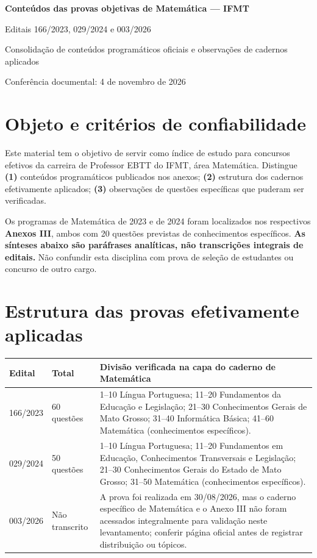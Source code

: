 \documentclass[11pt,a4paper]{article}
\begin{document}
\begin{center}
{\LARGE\bfseries Conteúdos das provas objetivas de Matemática --- IFMT\par}
\vspace{5pt}
{\large Editais 166/2023, 029/2024 e 003/2026\par}
\vspace{5pt}
{\small Consolidação de conteúdos programáticos oficiais e observações de cadernos aplicados\par}
{\small Conferência documental: 4 de novembro de 2026}
\end{center}
\tableofcontents\newpage
\section{Objeto e critérios de confiabilidade}
Este material tem o objetivo de servir como índice de estudo para concursos efetivos da carreira de Professor EBTT do IFMT, área Matemática. Distingue \textbf{(1)} conteúdos programáticos publicados nos anexos; \textbf{(2)} estrutura dos cadernos efetivamente aplicados; \textbf{(3)} observações de questões específicas que puderam ser verificadas.

Os programas de Matemática de 2023 e de 2024 foram localizados nos respectivos \textbf{Anexos III}, ambos com 20 questões previstas de conhecimentos específicos. \textbf{As sínteses abaixo são paráfrases analíticas, não transcrições integrais de editais.} Não confundir esta disciplina com prova de seleção de estudantes ou concurso de outro cargo.

\section{Estrutura das provas efetivamente aplicadas}
\begin{tabularx}{\textwidth}{p{}p{}X}
\toprule
\textbf{Edital}&\textbf{Total}&\textbf{Divisão verificada na capa do caderno de Matemática}\\\midrule
166/2023&60 questões&
1--10 Língua Portuguesa; 11--20 Fundamentos da Educação e Legislação;
21--30 Conhecimentos Gerais de Mato Grosso; 31--40 Informática Básica;
41--60 Matemática (conhecimentos específicos).\\
029/2024&50 questões&
1--10 Língua Portuguesa; 11--20 Fundamentos em Educação, Conhecimentos Transversais e Legislação;
21--30 Conhecimentos Gerais do Estado de Mato Grosso;
31--50 Matemática (conhecimentos específicos).\\
003/2026&Não transcrito&
A prova foi realizada em 30/08/2026, mas o caderno específico de Matemática e o Anexo III não foram acessados integralmente para validação neste levantamento; conferir página oficial antes de registrar distribuição ou tópicos.\\
\bottomrule
\end{tabularx}
\end{document}
